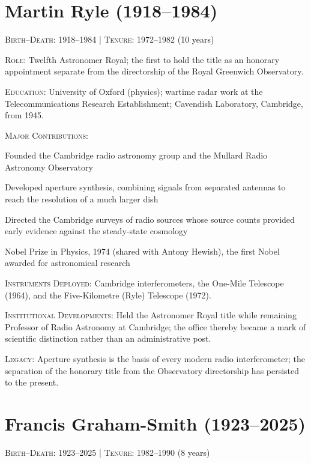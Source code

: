 \section*{Martin Ryle (1918--1984)}
\textsc{Birth--Death}: 1918--1984 | \textsc{Tenure}: 1972--1982 (10 years)

\noindent\textsc{Role}: Twelfth Astronomer Royal; the first to hold the title as an honorary appointment separate from the directorship of the Royal Greenwich Observatory.

\noindent\textsc{Education}: University of Oxford (physics); wartime radar work at the Telecommunications Research Establishment; Cavendish Laboratory, Cambridge, from 1945.

\noindent\textsc{Major Contributions}:
\begin{enumerate*}[label=(\arabic*)]
\item Founded the Cambridge radio astronomy group and the Mullard Radio Astronomy Observatory
\item Developed aperture synthesis, combining signals from separated antennas to reach the resolution of a much larger dish
\item Directed the Cambridge surveys of radio sources whose source counts provided early evidence against the steady-state cosmology
\item Nobel Prize in Physics, 1974 (shared with Antony Hewish), the first Nobel awarded for astronomical research
\end{enumerate*}

\noindent\textsc{Instruments Deployed}: Cambridge interferometers, the One-Mile Telescope (1964), and the Five-Kilometre (Ryle) Telescope (1972).

\noindent\textsc{Institutional Developments}: Held the Astronomer Royal title while remaining Professor of Radio Astronomy at Cambridge; the office thereby became a mark of scientific distinction rather than an administrative post.

\noindent\textsc{Legacy}: Aperture synthesis is the basis of every modern radio interferometer; the separation of the honorary title from the Observatory directorship has persisted to the present.

\medskip

\section*{Francis Graham-Smith (1923--2025)}
\textsc{Birth--Death}: 1923--2025 | \textsc{Tenure}: 1982--1990 (8 years)

